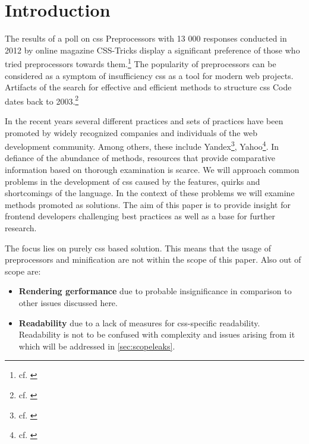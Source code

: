 \chapter{Introduction}
The results of a poll on \gls{css} Preprocessors with 13 000 responses conducted in 2012 by online magazine CSS-Tricks display a significant preference of those who tried preprocessors towards them.\footnote{cf. \cite{preprocessorpoll}}
The popularity of preprocessors can be considered as a symptom of insufficiency \gls{css} as a tool for modern web projects.
Artifacts of the search for effective and efficient methods to structure \gls{css} Code dates back to 2003.\footnote{cf. \cite{methodmails}}

In the recent years several different practices and sets of practices have been promoted by widely recognized companies and individuals of the web development community.
Among others, these include Yandex\footnote{cf. \cite{bem}}, Yahoo\footnote{cf. \cite{atomiccsssite}}.
In defiance of the abundance of methods, resources that provide comparative information based on thorough examination is scarce.
We will approach common problems in the development of \gls{css} caused by the features, quirks and shortcomings of the language.
In the context of these problems we will examine methods promoted as solutions.
The aim of this paper is to provide insight for frontend developers challenging best practices as well as a base for further research.

The focus lies on purely \gls{css} based solution.
This means that the usage of preprocessors and minification are not within the scope of this paper.
Also out of scope are:
\begin{itemize}
    \item {\normalfont \bfseries Rendering gerformance} due to probable insignificance in comparison to other issues discussed here.
    \item {\normalfont \bfseries Readability} due to a lack of measures for \gls{css}-specific readability. 
        Readability is not to be confused with complexity and issues arising from it which will be addressed in \autoref{sec:scopeleaks}.
\end{itemize}




